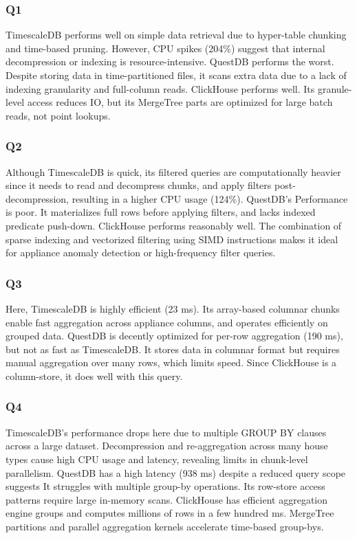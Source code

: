 \documentclass[conference]{IEEEtran}
\begin{document}
\subsubsection{Q1}
TimescaleDB performs well on simple data retrieval due to hyper-table chunking and time-based pruning. However, CPU spikes (204\%) suggest that internal decompression or indexing is resource-intensive.
QuestDB performs the worst. Despite storing data in time-partitioned files, it scans extra data due to a lack of indexing granularity and full-column reads.
ClickHouse performs well. Its granule-level access reduces IO, but its MergeTree parts are optimized for large batch reads, not point lookups.

\subsubsection{Q2}

Although TimescaleDB is quick, its filtered queries are computationally heavier since it needs to read and decompress chunks, and apply filters post-decompression, resulting in a higher CPU usage (124\%).
QuestDB's Performance is poor. It materializes full rows before applying filters, and lacks indexed predicate push-down.
ClickHouse performs reasonably well. The combination of sparse indexing and vectorized filtering using SIMD instructions makes it ideal for appliance anomaly detection or high-frequency filter queries.

\subsubsection{Q3}
Here, TimescaleDB is highly efficient (23 ms). Its array-based columnar chunks enable fast aggregation across appliance columns, and operates efficiently on grouped data.
QuestDB is decently optimized for per-row aggregation (190 ms), but not as fast as TimescaleDB\@. It stores data in columnar format but requires manual aggregation over many rows, which limits speed.
Since ClickHouse is a column-store, it does well with this query.

\subsubsection{Q4}
TimescaleDB's performance drops here due to multiple GROUP BY clauses across a large dataset. Decompression and re-aggregation across many house types cause high CPU usage and latency, revealing limits in chunk-level parallelism.
QuestDB has a high latency (938 ms) despite a reduced query scope suggests It struggles with multiple group-by operations. Its row-store access patterns require large in-memory scans.
ClickHouse has efficient aggregation engine groups and computes millions of rows in a few hundred ms. MergeTree partitions and parallel aggregation kernels accelerate time-based group-bys.
\end{document}
